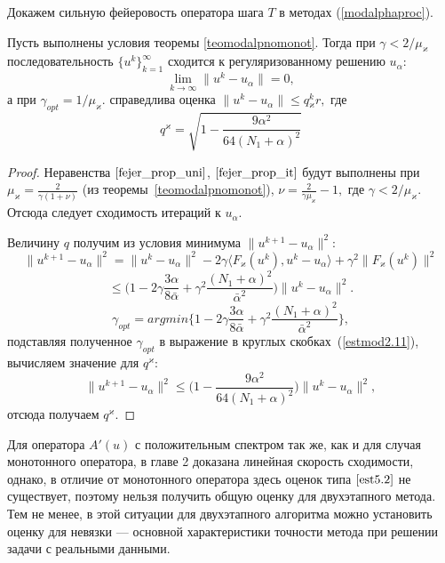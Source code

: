 Докажем сильную фейеровость оператора шага $T$ в методах (\ref{modalphaproc}).
\begin{theorem}
	Пусть выполнены условия теоремы \ref{teomodalpnomonot}. Тогда при $\gamma < 2/\mu_\varkappa$ последовательность $\{u^k\}_{k=1}^\infty$ сходится к регуляризованному решению $u_\alpha$: $$\lim\limits_{k\to\infty}\|u^k-u_\alpha\|=0,$$ а при $\gamma_{opt}=1/\mu_\varkappa.$ справедлива оценка $\|u^k-u_\alpha\|\le q{_\varkappa^k}r,$ где
	$$q^\varkappa=\sqrt{1-\frac{9\alpha^2}{64(N_1+\alpha)^2}}$$
\end{theorem}
\begin{proof} Неравенства $\eqref{fejer_prop_uni}$, $\eqref{fejer_prop_it}$ будут выполнены при $\mu_\varkappa=\frac{2}{\gamma(1+\nu)}$ (из теоремы~\ref{teomodalpnomonot}), $\nu=\frac{2}{\gamma\mu_\varkappa}-1,$ где $\gamma<2/\mu_\varkappa$. Отсюда следует сходимость итераций к $u_\alpha$.

Величину $q$ получим из условия минимума $\|u^{k+1}-u_\alpha\|^2$:
$$\|u^{k+1}-u_\alpha\|^2=\|u^k-u_\alpha\|^2-2\gamma\langle F_\varkappa(u^k), u^k-u_\alpha\rangle+\gamma^2\|F_\varkappa(u^k)\|^2$$
\begin{equation}\label{estmod2.11}
\le\big(1-2\gamma\frac{3\alpha}{8\bar{\alpha}}+\gamma^2\frac{(N_1+\alpha)^2}{\bar{\alpha}^2}\big)\|u^k-u_\alpha\|^2.
\end{equation}
$$\gamma_{opt}=argmin\{1-2\gamma\frac{3\alpha}{8\bar{\alpha}}+\gamma^2\frac{(N_1+\alpha)^2}{\bar{\alpha}^2}\},$$
подставляя полученное $\gamma_{opt}$ в выражение в круглых скобках~(\ref{estmod2.11}), вычисляем значение для $q^\varkappa$:
$$\|u^{k+1}-u_\alpha\|^2\le\big(1-\frac{9\alpha^2}{64(N_1+\alpha)^2}\big)\|u^k-u_\alpha\|^2,$$ отсюда получаем $q^\varkappa$.
\end{proof}

Для оператора $A'(u)$ с положительным спектром так же, как и для случая монотонного оператора, в главе 2 доказана линейная скорость сходимости, однако, в отличие от монотонного оператора здесь оценок типа $\eqref{est5.2}$ не существует, поэтому нельзя получить общую оценку для двухэтапного метода. Тем не менее, в этой ситуации для двухэтапного алгоритма можно установить оценку для невязки --- основной характеристики точности метода при решении задачи с реальными данными.


